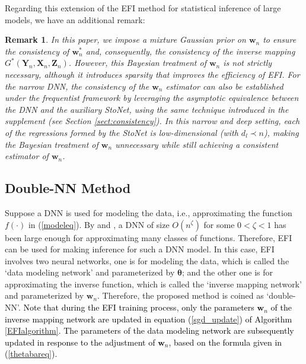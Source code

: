 \documentclass[11pt]{article}
\newcommand{\bX}{{\boldsymbol X}}
\newcommand{\bY}{{\boldsymbol Y}}
\newcommand{\bZ}{{\boldsymbol Z}}
\newcommand{\bw}{{\boldsymbol w}}
\newcommand{\btheta}{{\boldsymbol \theta}}
\newtheorem{remark}{Remark}
\begin{document}
Regarding this extension of the EFI method for statistical inference of large models, we have an additional remark: 

\begin{remark} 
In this paper, we impose a mixture Gaussian prior on $\bw_n$ to ensure the consistency of $\bw_n^*$ and, consequently, 
the consistency of the inverse mapping $G^*(\bY_n,\bX_n,\bZ_n)$. 
However, this Bayesian treatment of $\bw_n$ is not strictly necessary, although it introduces sparsity that improves the efficiency of EFI.
For the narrow DNN, the consistency of the $\bw_n$ estimator can also be established under the frequentist framework by leveraging the asymptotic equivalence between the DNN and the auxiliary StoNet, using the same technique introduced in the supplement (see Section \ref{sect:consistency}). In this narrow and deep setting, each of the regressions formed by the StoNet is low-dimensional (with $d_l \prec n$), making the Bayesian treatment of $\bw_n$ unnecessary while still achieving a consistent estimator of $\bw_n$.
\end{remark} 


\subsection{Double-NN Method}

Suppose a DNN  is used for modeling the data, i.e., approximating the function $f(\cdot)$ in (\ref{modeleq}). 
By \cite{SunSLiang2021} and \cite{Farrell2021DeepNN}, a DNN of 
size $O(n^{\zeta})$ for some $0<\zeta<1$ has been large enough for approximating  many classes 
of functions. Therefore, EFI can be used for making inference for such a 
DNN model. 
In this case, EFI involves two neural networks, one is for modeling the data, which is called the `data modeling network' and parameterized by $\btheta$; 
and the other one is for approximating the inverse function, which is called the `inverse mapping network' and parameterized by $\bw_n$. 
Therefore, the proposed method is coined as `double-NN'. 
\textcolor{black}{
Note that during the EFI training process, only the parameters  $\bw_n$ of the inverse mapping network are updated in equation (\ref{sgd_update}) of Algorithm \ref{EFIalgorithm}. The parameters of the data modeling network are subsequently updated in response to the adjustment of $\bw_n$, based on the formula given in  (\ref{thetabareq}).} 
\end{document}
